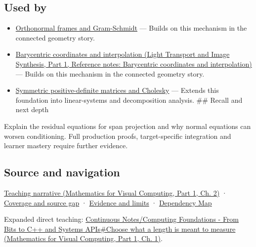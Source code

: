 \subsection{Used by}\label{appendix-3b863809f82a-used-by}

\hypertarget{appendix-3b863809f82a-used-by}{}

\begin{itemize}
\tightlist
\item
  \hyperref[appendix-c39f1ed34271]{Orthonormal frames and Gram-Schmidt} --- Builds on this mechanism in the connected geometry story.
\item
  \href{../04-Light-Transport-and-Image-Synthesis-P01/main.pdf\#appendix-02b9d9a81dca}{Barycentric coordinates and interpolation (Light Transport and Image Synthesis, Part 1, Reference notes: Barycentric coordinates and interpolation)} --- Builds on this mechanism in the connected geometry story.
\item
  \hyperref[appendix-50d2ea3c9b26]{Symmetric positive-definite matrices and Cholesky} --- Extends this foundation into linear-systems and decomposition analysis. \#\# Recall and next depth
\end{itemize}

Explain the residual equations for span projection and why normal equations can worsen conditioning. Full production proofs, target-specific integration and learner mastery require further evidence.

\subsection{Source and navigation}\label{appendix-3b863809f82a-source-and-navigation}

\hypertarget{appendix-3b863809f82a-source-and-navigation}{}

\href{../02-Mathematics-for-Visual-Computing-P01/main.pdf\#01-foundations-i-ch018-a-gram-matrix-remembers-the-geometry-of-a-slanted-basis}{Teaching narrative (Mathematics for Visual Computing, Part 1, Ch. 2)} · \hyperref[appendix-fd090d982a15-phase-6---parts-501-600]{Coverage and source gap} · \hyperref[appendix-a103e7846d21-phase-6---source-analysis-and-verification]{Evidence and limits} · \hyperref[appendix-4ad47bdd269a]{Dependency Map}

Expanded direct teaching: \href{../02-Mathematics-for-Visual-Computing-P01/main.pdf\#01-foundations-i-ch017-choose-what-a-length-is-meant-to-measure}{Continuous Notes/Computing Foundations - From Bits to C++ and Systems APIs\#Choose what a length is meant to measure (Mathematics for Visual Computing, Part 1, Ch. 1)}.
